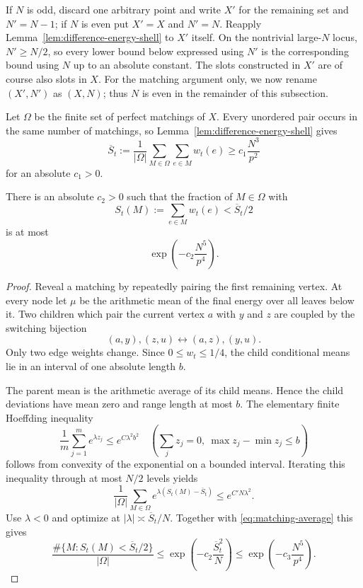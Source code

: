 If $N$ is odd, discard one arbitrary point and write $X'$ for the remaining
set and $N'=N-1$; if $N$ is even put $X'=X$ and $N'=N$.  Reapply
Lemma~\ref{lem:difference-energy-shell} to $X'$ itself.  On the nontrivial
large-$N$ locus, $N'\ge N/2$, so every lower bound below expressed using $N'$
is the corresponding bound using $N$ up to an absolute constant.  The slots
constructed in $X'$ are of course also slots in $X$.  For the matching
argument only, we now rename $(X',N')$ as $(X,N)$; thus $N$ is even in the
remainder of this subsection.

Let $\Omega$ be the finite set of perfect matchings of $X$.  Every unordered
pair occurs in the same number of matchings, so
Lemma~\ref{lem:difference-energy-shell} gives
\[
\overline S_t
:=\frac1{|\Omega|}\sum_{M\in\Omega}\sum_{e\in M}w_t(e)
\ge c_1\frac{N^3}{p^2}
\tag{AC3}\label{eq:matching-average}
\]
for an absolute $c_1>0$.

\begin{lemma}\label{lem:matching-concentration}
There is an absolute $c_2>0$ such that the fraction of $M\in\Omega$ with
\[
S_t(M):=\sum_{e\in M}w_t(e)<\overline S_t/2
\]
is at most
\[
\exp\!\left(-c_2\frac{N^5}{p^4}\right).
\]
\end{lemma}

\begin{proof}
Reveal a matching by repeatedly pairing the first remaining vertex.  At every
node let $\mu$ be the arithmetic mean of the final energy over all leaves
below it.  Two children which pair the current vertex $a$ with $y$ and $z$ are
coupled by the switching bijection
\[
(a,y),(z,u)\longleftrightarrow(a,z),(y,u).
\]
Only two edge weights change.  Since $0\le w_t\le1/4$, the child conditional
means lie in an interval of one absolute length $b$.

The parent mean is the arithmetic average of its child means.  Hence the child
deviations have mean zero and range length at most $b$.  The elementary finite
Hoeffding inequality
\[
\frac1m\sum_{j=1}^m e^{\lambda z_j}
\le e^{C\lambda^2b^2}
\quad
\left(\sum_jz_j=0,\ \max z_j-\min z_j\le b\right)
\]
follows from convexity of the exponential on a bounded interval.  Iterating
this inequality through at most $N/2$ levels yields
\[
\frac1{|\Omega|}\sum_{M\in\Omega}
 e^{\lambda(S_t(M)-\overline S_t)}
\le e^{C'N\lambda^2}.
\]
Use $\lambda<0$ and optimize at
$|\lambda|\asymp\overline S_t/N$.  Together with
\eqref{eq:matching-average} this gives
\[
\frac{\#\{M:S_t(M)<\overline S_t/2\}}{|\Omega|}
\le
\exp\!\left(-c_2\frac{\overline S_t^2}{N}\right)
\le
\exp\!\left(-c_3\frac{N^5}{p^4}\right).
\]
\end{proof}


